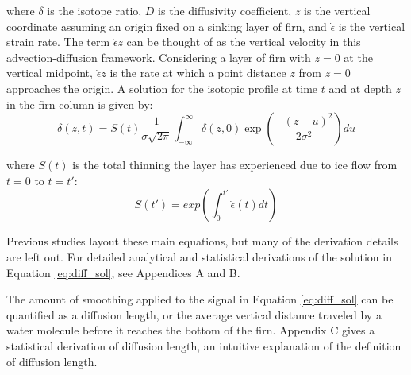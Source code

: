 \documentclass[draft, jgrga]{AGUTeX}
\begin{document}
\begin{article}
\noindent where \begin{math} \delta \end{math} is the isotope ratio, \begin{math} D \end{math} is the diffusivity coefficient, \begin{math} z \end{math} is the vertical coordinate assuming an origin fixed on a sinking layer of firn, and \begin{math} \dot{\epsilon} \end{math} is the vertical strain rate. The term \begin{math} \dot{\epsilon} z \end{math} can be thought of as the vertical velocity in this advection-diffusion framework. Considering a layer of firn with \begin{math} z = 0 \end{math} at the vertical midpoint, \begin{math} \dot{\epsilon} z \end{math} is the rate at which a point distance \begin{math} z \end{math} from \begin{math} z=0 \end{math} approaches the origin. A solution for the isotopic profile at time $t$ and at depth $z$ in the firn column is given by:
\begin{equation}
\label{eq:diff_sol}
\delta (z,t) = S(t) \frac{1}{\sigma \sqrt{2 \pi}}
\int^\infty_{-\infty} \delta (z,0) \exp \left(\frac{-(z-u)^2}{2 \sigma ^2} \right)du
\end{equation}

\noindent where \begin{math} S(t) \end{math} is the total thinning the layer has experienced due to ice flow from $t=0$ to $t=t'$:
\begin{equation}
S(t') = exp \left( \int^{t'}_{0} \dot{\epsilon}(t) dt \right)
\end{equation}

Previous studies layout these main equations, but many of the derivation details are left out. For detailed analytical and statistical derivations of the solution in Equation \ref{eq:diff_sol}, see Appendices A and B.

The amount of smoothing applied to the signal in Equation \ref{eq:diff_sol} can be quantified as a diffusion length, or the average vertical distance traveled by a water molecule before it reaches the bottom of the firn. Appendix C gives a statistical derivation of diffusion length, an intuitive explanation of the definition of diffusion length.


\end{article}
\end{document}
